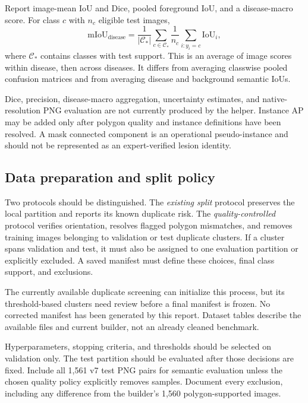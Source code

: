 Report image-mean IoU and Dice, pooled foreground IoU, and a disease-macro score. For class $c$ with $n_c$ eligible test images,
\begin{equation}
 \mathrm{mIoU}_{\mathrm{disease}}=
 \frac{1}{|\mathcal C_*|}\sum_{c\in\mathcal C_*}
 \frac{1}{n_c}\sum_{i:y_i=c}\mathrm{IoU}_i,
\end{equation}
where $\mathcal C_*$ contains classes with test support. This is an average of image scores within disease, then across diseases. It differs from averaging classwise pooled confusion matrices and from averaging disease and background semantic IoUs.

Dice, precision, disease-macro aggregation, uncertainty estimates, and native-resolution PNG evaluation are not currently produced by the helper. Instance AP may be added only after polygon quality and instance definitions have been resolved. A mask connected component is an operational pseudo-instance and should not be represented as an expert-verified lesion identity.

\subsection{Data preparation and split policy}
Two protocols should be distinguished. The \emph{existing split} protocol preserves the local partition and reports its known duplicate risk. The \emph{quality-controlled} protocol verifies orientation, resolves flagged polygon mismatches, and removes training images belonging to validation or test duplicate clusters. If a cluster spans validation and test, it must also be assigned to one evaluation partition or explicitly excluded. A saved manifest must define these choices, final class support, and exclusions.

The currently available duplicate screening can initialize this process, but its threshold-based clusters need review before a final manifest is frozen. No corrected manifest has been generated by this report. Dataset tables describe the available files and current builder, not an already cleaned benchmark.

Hyperparameters, stopping criteria, and thresholds should be selected on validation only. The test partition should be evaluated after those decisions are fixed. Include all 1,561 v7 test PNG pairs for semantic evaluation unless the chosen quality policy explicitly removes samples. Document every exclusion, including any difference from the builder's 1,560 polygon-supported images.

